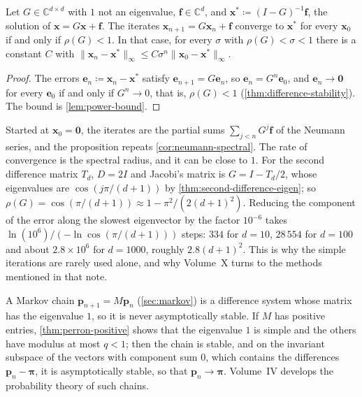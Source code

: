 \begin{proposition}
\label{prop:stationary-iteration}
Let $G\in\mathbb C^{d\times d}$ with $1$ not an eigenvalue, $\mathbf f\in\mathbb C^d$, and $\mathbf x^*\coloneqq(I-G)^{-1}\mathbf f$, the solution of $\mathbf x=G\mathbf x+\mathbf f$. The iterates $\mathbf x_{n+1}=G\mathbf x_n+\mathbf f$ converge to $\mathbf x^*$ for every $\mathbf x_0$ if and only if $\rho(G)<1$. In that case, for every $\sigma$ with $\rho(G)<\sigma<1$ there is a constant $C$ with $\|\mathbf x_n-\mathbf x^*\|_\infty\le C\sigma^n\|\mathbf x_0-\mathbf x^*\|_\infty$.
\end{proposition}

\begin{proof}
The errors $\mathbf e_n\coloneqq\mathbf x_n-\mathbf x^*$ satisfy $\mathbf e_{n+1}=G\mathbf e_n$, so $\mathbf e_n=G^n\mathbf e_0$, and $\mathbf e_n\to\mathbf 0$ for every $\mathbf e_0$ if and only if $G^n\to0$, that is, $\rho(G)<1$ (\cref{thm:difference-stability}). The bound is \cref{lem:power-bound}.
\end{proof}

Started at $\mathbf x_0=\mathbf 0$, the iterates are the partial sums $\sum_{j<n}G^j\mathbf f$ of the Neumann series, and the proposition repeats \cref{cor:neumann-spectral}. The rate of convergence is the spectral radius, and it can be close to $1$. For the second difference matrix $T_d$, $D=2I$ and Jacobi's matrix is $G=I-T_d/2$, whose eigenvalues are $\cos(j\pi/(d+1))$ by \cref{thm:second-difference-eigen}; so $\rho(G)=\cos(\pi/(d+1))\approx1-\pi^2/(2(d+1)^2)$. Reducing the component of the error along the slowest eigenvector by the factor $10^{-6}$ takes $\ln(10^6)/(-\ln\cos(\pi/(d+1)))$ steps: $334$ for $d=10$, $28\,554$ for $d=100$ and about $2.8\times10^6$ for $d=1000$, roughly $2.8(d+1)^2$. This is why the simple iterations are rarely used alone, and why Volume~X turns to the methods mentioned in that note.

A Markov chain $\mathbf p_{n+1}=M\mathbf p_n$ (\cref{sec:markov}) is a difference system whose matrix has the eigenvalue $1$, so it is never asymptotically stable. If $M$ has positive entries, \cref{thm:perron-positive} shows that the eigenvalue $1$ is simple and the others have modulus at most $q<1$; then the chain is stable, and on the invariant subspace of the vectors with component sum $0$, which contains the differences $\mathbf p_n-\boldsymbol\pi$, it is asymptotically stable, so that $\mathbf p_n\to\boldsymbol\pi$. Volume~IV develops the probability theory of such chains.

